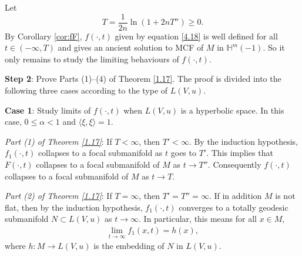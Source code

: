 \documentclass[12pt]{article}
\begin{document}
Let
\begin{equation} \label{eqn:T}
 T = \frac{1}{2n} \ln(1+2nT'') \geq  0.
\end{equation}
By Corollary \ref{cor:fF}, $f(\cdot, t)$ given by equation \eqref{4.18} is well defined for all $t \in (-\infty, T)$
and gives an ancient solution to MCF of $M$ in $\mathbb{H}^m(-1)$.
So it only remains to study the limiting behaviours of $f(\cdot, t)$.


\vspace{6pt}
\textbf{Step 2}: Prove Parts (1)--(4) of Theorem \ref{1.17}. The proof is divided into the following three cases according  to the type of $L(V,u)$.

\textbf{Case 1}: Study limits of $f(\cdot, t)$ when $L(V,u)$ is a hyperbolic space.
In this case, $0\leq \alpha<1$ and $\langle\xi,\xi\rangle=1$.

{\it Part (1) of Theorem \ref{1.17}}: If $T<\infty$, then $T'<\infty$. By the induction hypothesis, $f_1(\cdot, t)$ collapses to a focal submanifold
as $t$ goes to  $T'$. This implies that $F(\cdot, t)$
collapses to a focal submanifold of $M$ as $t \rightarrow T''$. Consequently
$f(\cdot, t)$ collapses to
a focal submanifold of $M$ as $t \rightarrow T$.

{\it Part (2) of Theorem \ref{1.17}}: If $T=\infty$, then $T'=T''=\infty$. If in addition $M$ is not flat,  %
then by the induction hypothesis, $f_1(\cdot,t)$ converges to a totally geodesic
submanifold $N \subset L(V,u) $  as $t \rightarrow \infty$. In particular, this means for all $x \in M$,
\begin{align}
     	\lim_{t\rightarrow \infty} f_1(x,t) = h(x),     \label{4.20}
\end{align}
where $h: M\rightarrow L(V,u)$ is the embedding of $N$ in $L(V,u)$.
		
\end{document}
